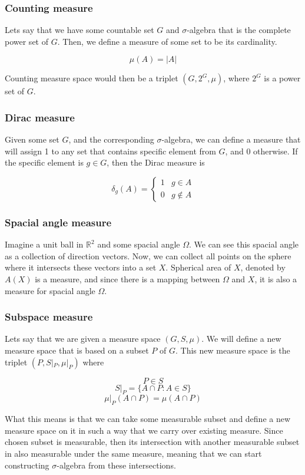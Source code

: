 \documentclass{article}
\begin{document}
\subsubsection{Counting measure}
Lets say that we have some countable set $G$ and $\sigma$-algebra that is the complete power set of $G$. Then, we define a measure of some set to be its cardinality.

\[ \mu(A)=|A| \]

Counting measure space would then be a triplet $(G,2^G,\mu)$, where $2^G$ is a power set of $G$.

\subsubsection{Dirac measure}
Given some set $G$, and the corresponding $\sigma$-algebra, we can define a measure that will assign 1 to any set that contains specific element from $G$, and 0 otherwise. If the specific element is $g \in G$, then the Dirac measure is

\[ \delta_g(A)=\begin{cases}
    1 & g \in A \\
    0 & g \notin A
\end{cases} \]

\subsubsection{Spacial angle measure}
Imagine a unit ball in $\mathbb{R}^2$ and some spacial angle $\Omega$. We can see this spacial angle as a collection of direction vectors. Now, we can collect all points on the sphere where it intersects these vectors into a set $X$. Spherical area of $X$, denoted by $A(X)$ is a measure, and since there is a mapping between $\Omega$ and $X$, it is also a measure for spacial angle $\Omega$.

\subsubsection{Subspace measure}
Lets say that we are given a measure space $(G,S,\mu)$. We will define a new measure space that is based on a subset $P$ of $G$. This new measure space is the triplet $(P,S|_P,\mu|_P)$ where

\[P \in S \]
\[ S|_P=\{A \cap P: A \in S\} \]
\[ \mu|_P(A \cap P)=\mu(A \cap P) \]

What this means is that we can take some measurable subset and define a new measure space on it in such a way that we carry over existing measure. Since chosen subset is measurable, then its intersection with another measurable subset in also measurable under the same measure, meaning that we can start constructing $\sigma$-algebra from these intersections.
\end{document}
